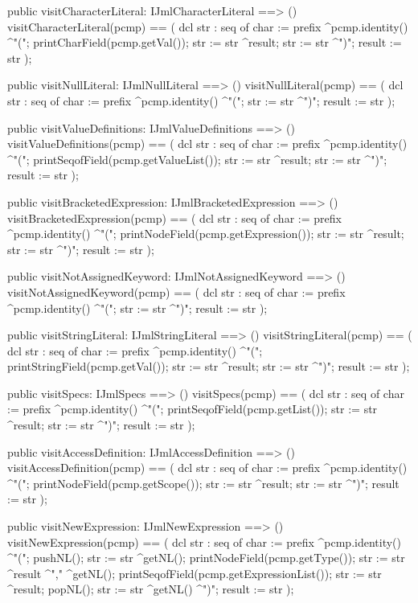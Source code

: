 \begin{vdm_al}
  public visitCharacterLiteral: IJmlCharacterLiteral ==> ()
  visitCharacterLiteral(pcmp) ==
    ( dcl str : seq of char := prefix ^pcmp.identity() ^"(";
      printCharField(pcmp.getVal());
      str := str ^result;
      str := str ^")";
      result := str );

  public visitNullLiteral: IJmlNullLiteral ==> ()
  visitNullLiteral(pcmp) ==
    ( dcl str : seq of char := prefix ^pcmp.identity() ^"(";
      str := str ^")";
      result := str );

  public visitValueDefinitions: IJmlValueDefinitions ==> ()
  visitValueDefinitions(pcmp) ==
    ( dcl str : seq of char := prefix ^pcmp.identity() ^"(";
      printSeqofField(pcmp.getValueList());
      str := str ^result;
      str := str ^")";
      result := str );

  public visitBracketedExpression: IJmlBracketedExpression ==> ()
  visitBracketedExpression(pcmp) ==
    ( dcl str : seq of char := prefix ^pcmp.identity() ^"(";
      printNodeField(pcmp.getExpression());
      str := str ^result;
      str := str ^")";
      result := str );

  public visitNotAssignedKeyword: IJmlNotAssignedKeyword ==> ()
  visitNotAssignedKeyword(pcmp) ==
    ( dcl str : seq of char := prefix ^pcmp.identity() ^"(";
      str := str ^")";
      result := str );

  public visitStringLiteral: IJmlStringLiteral ==> ()
  visitStringLiteral(pcmp) ==
    ( dcl str : seq of char := prefix ^pcmp.identity() ^"(";
      printStringField(pcmp.getVal());
      str := str ^result;
      str := str ^")";
      result := str );

  public visitSpecs: IJmlSpecs ==> ()
  visitSpecs(pcmp) ==
    ( dcl str : seq of char := prefix ^pcmp.identity() ^"(";
      printSeqofField(pcmp.getList());
      str := str ^result;
      str := str ^")";
      result := str );

  public visitAccessDefinition: IJmlAccessDefinition ==> ()
  visitAccessDefinition(pcmp) ==
    ( dcl str : seq of char := prefix ^pcmp.identity() ^"(";
      printNodeField(pcmp.getScope());
      str := str ^result;
      str := str ^")";
      result := str );

  public visitNewExpression: IJmlNewExpression ==> ()
  visitNewExpression(pcmp) ==
    ( dcl str : seq of char := prefix ^pcmp.identity() ^"(";
      pushNL();
      str := str ^getNL();
      printNodeField(pcmp.getType());
      str := str ^result ^"," ^getNL();
      printSeqofField(pcmp.getExpressionList());
      str := str ^result;
      popNL();
      str := str ^getNL() ^")";
      result := str );


\end{vdm_al}
